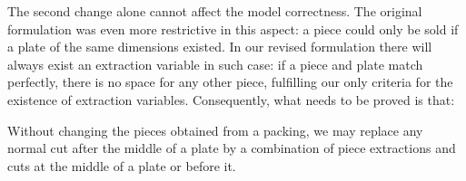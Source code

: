 \documentclass[9pt]{entcs}
\begin{document}
The second change alone cannot affect the model correctness.
The original formulation was even more restrictive in this aspect:
a piece could only be sold if a plate of the same dimensions existed.
In our revised formulation there will always exist an extraction variable in such case:
if a piece and plate match perfectly, there is no space for any other piece, fulfilling our only criteria for the existence of extraction variables.
Consequently, what needs to be proved is that:

\begin{theorem}
\label{the:enhanced_correctness}
Without changing the pieces obtained from a packing, we may replace any normal cut after the middle of a plate by a combination of piece extractions and cuts at the middle of a plate or before it.
\end{theorem}

\end{document}
